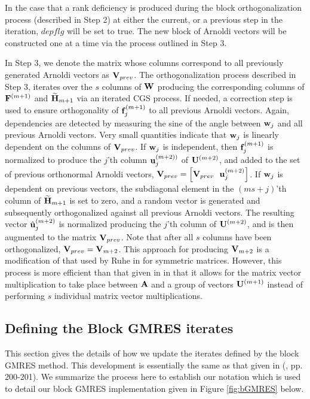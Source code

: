 \documentclass[twoside]{siamltex}
\newcommand{\bA}{{\bf A}}
\newcommand{\bF}{{\bf F}}
\newcommand{\bH}{{\bf H}}
\newcommand{\bV}{{\bf V}}
\newcommand{\bU}{{\bf U}}
\newcommand{\bW}{{\bf W}}
\newcommand{\bu}{{\bf u}}
\newcommand{\bw}{{\bf w}}
\begin{document}
In the case that a rank deficiency is produced during the block
orthogonalization process (described in Step 2) at either the
current, or a previous step in the iteration, $depflg$ will be set
to true. The new block of Arnoldi vectors will be constructed one
at a time via the process outlined in Step 3.

In Step 3, we denote the matrix whose columns correspond to all
previously generated Arnoldi vectors as $\bV_{prev}$. The
orthogonalization process described in Step 3, iterates over the
$s$ columns of $\bW$ producing the corresponding columns of
$\bF^{(m+1)}$ and ${\widetilde \bH}_{m+1}$ via an iterated CGS
process. If needed, a correction step is used to ensure
orthogonality of ${\bf f}_j^{(m+1)}$ to all previous Arnoldi
vectors. Again, dependencies are detected by measuring the sine of
the angle between $\bw_j$ and all previous Arnoldi vectors. Very
small quantities indicate that $\bw_j$ is linearly dependent on
the columns of $\bV_{prev}$. If $\bw_j$ is independent, then ${\bf
f}_j^{(m+1)}$ is normalized to produce the $j$'th column
$\bu_j^{(m+2))}$ of $\bU^{(m+2)}$, and added to the set of
previous orthonormal Arnoldi vectors, $\bV_{prev} = \left[
\bV_{prev} ~~ \bu_j^{(m+2)} \right]$. If $\bw_j$ is dependent on
previous vectors, the subdiagonal element in the $(ms+j)$'th
column of ${\widetilde \bH}_{m+1}$ is set to zero, and a random
vector is generated and subsequently orthogonalized against all
previous Arnoldi vectors. The resulting vector ${\hat
\bu}_j^{(m+2)}$ is normalized producing the $j$'th column of
$\bU^{(m+2)}$, and is then augmented to the matrix $\bV_{prev}$.
Note that after all $s$ columns have been orthogonalized,
$\bV_{prev} = \bV_{m+2}$. This approach for producing $\bV_{m+2}$
is a modification of that used by Ruhe in \cite{ruhe:79} for
symmetric matrices. However, this process is more efficient than
that given in \cite{ruhe:79} in that it allows for the matrix
vector multiplication to take place between $\bA$ and a group of
vectors $\bU^{(m+1)}$ instead of performing $s$ individual matrix
vector multiplications.


\subsection{Defining the Block GMRES iterates}
\label{sec:belosblkgmres}

This section gives the details of how we update the iterates
defined by the block GMRES method. This development is essentially
the same as that given in (\cite{Sa96}, pp. 200-201). We summarize
the process here to establish our notation which is used to detail
our block GMRES implementation given in Figure \ref{fig:bGMRES}
below.
\end{document}
